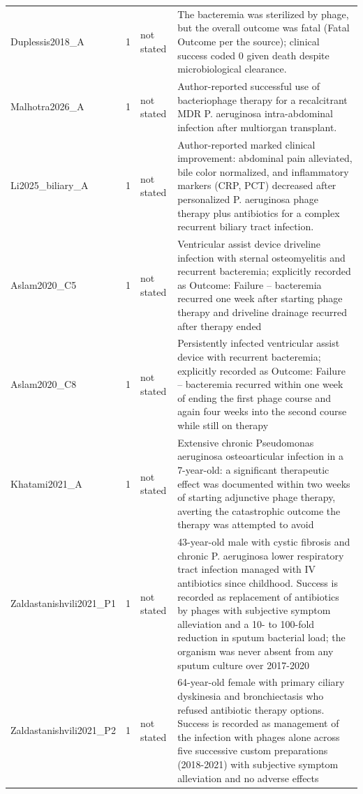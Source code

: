 \begin{tabular}{p{2.6cm}cp{1.5cm}p{8.4cm}}
Duplessis2018\_A & 1 & not stated & The bacteremia was sterilized by phage, but the overall outcome was fatal (Fatal Outcome per the source); clinical success coded 0 given death despite microbiological clearance. \\
Malhotra2026\_A & 1 & not stated & Author-reported successful use of bacteriophage therapy for a recalcitrant MDR P. aeruginosa intra-abdominal infection after multiorgan transplant. \\
Li2025\_biliary\_A & 1 & not stated & Author-reported marked clinical improvement: abdominal pain alleviated, bile color normalized, and inflammatory markers (CRP, PCT) decreased after personalized P. aeruginosa phage therapy plus antibiotics for a complex recurrent biliary tract infection. \\
Aslam2020\_C5 & 1 & not stated & Ventricular assist device driveline infection with sternal osteomyelitis and recurrent bacteremia; explicitly recorded as Outcome: Failure -- bacteremia recurred one week after starting phage therapy and driveline drainage recurred after therapy ended \\
Aslam2020\_C8 & 1 & not stated & Persistently infected ventricular assist device with recurrent bacteremia; explicitly recorded as Outcome: Failure -- bacteremia recurred within one week of ending the first phage course and again four weeks into the second course while still on therapy \\
Khatami2021\_A & 1 & not stated & Extensive chronic Pseudomonas aeruginosa osteoarticular infection in a 7-year-old: a significant therapeutic effect was documented within two weeks of starting adjunctive phage therapy, averting the catastrophic outcome the therapy was attempted to avoid \\
Zaldastanishvili2021\_P1 & 1 & not stated & 43-year-old male with cystic fibrosis and chronic P. aeruginosa lower respiratory tract infection managed with IV antibiotics since childhood. Success is recorded as replacement of antibiotics by phages with subjective symptom alleviation and a 10- to 100-fold reduction in sputum bacterial load; the organism was never absent from any sputum culture over 2017-2020 \\
Zaldastanishvili2021\_P2 & 1 & not stated & 64-year-old female with primary ciliary dyskinesia and bronchiectasis who refused antibiotic therapy options. Success is recorded as management of the infection with phages alone across five successive custom preparations (2018-2021) with subjective symptom alleviation and no adverse effects \\

\end{tabular}
